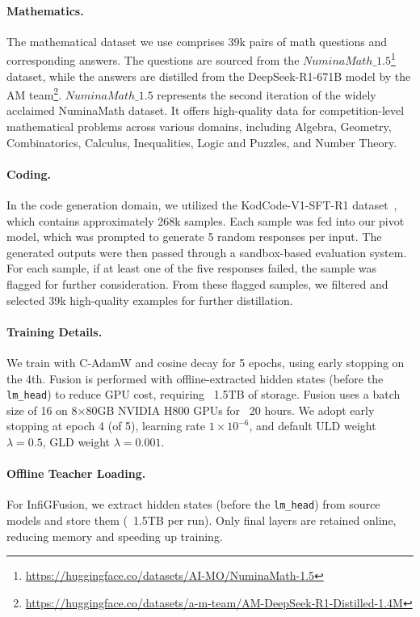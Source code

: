 \documentclass{article}
\begin{document}
\paragraph{Mathematics.}
The mathematical dataset we use comprises 39k pairs of math questions and corresponding answers. The questions are sourced from the $NuminaMath\_1.5$\footnote{\href{https://huggingface.co/datasets/AI-MO/NuminaMath-1.5}{https://huggingface.co/datasets/AI-MO/NuminaMath-1.5}} dataset, while the answers are distilled from the DeepSeek-R1-671B model by the AM team\footnote{\href{https://huggingface.co/datasets/a-m-team/AM-DeepSeek-R1-Distilled-1.4M}{https://huggingface.co/datasets/a-m-team/AM-DeepSeek-R1-Distilled-1.4M}}. $NuminaMath\_1.5$ represents the second iteration of the widely acclaimed NuminaMath\cite{li2024numinamath} dataset. It offers high-quality data for competition-level mathematical problems across various domains, including Algebra, Geometry, Combinatorics, Calculus, Inequalities, Logic and Puzzles, and Number Theory.
\paragraph{Coding.}
In the code generation domain, we utilized the KodCode-V1-SFT-R1 dataset~\cite{xu2025kodcode}, which contains approximately 268k samples. Each sample was fed into our pivot model, which was prompted to generate 5 random responses per input. The generated outputs were then passed through a sandbox-based evaluation system. For each sample, if at least one of the five responses failed, the sample was flagged for further consideration. From these flagged samples, we filtered and selected 39k high-quality examples for further distillation.





\paragraph{Training Details.}
We train with C-AdamW and cosine decay for 5 epochs, using early stopping on the 4th. Fusion is performed with offline-extracted hidden states (before the \texttt{lm\_head}) to reduce GPU cost, requiring ~1.5TB of storage. 
Fusion uses a batch size of 16 on 8×80GB NVIDIA H800 GPUs for ~20 hours. We adopt early stopping at epoch 4 (of 5), learning rate $1\times10^{-6}$, and default ULD weight $\lambda=0.5$, GLD weight $\lambda=0.001$. 




\paragraph{Offline Teacher Loading.}
For InfiGFusion, we extract hidden states (before the \texttt{lm\_head}) from source models and store them (~1.5TB per run). Only final layers are retained online, reducing memory and speeding up training.
\end{document}

